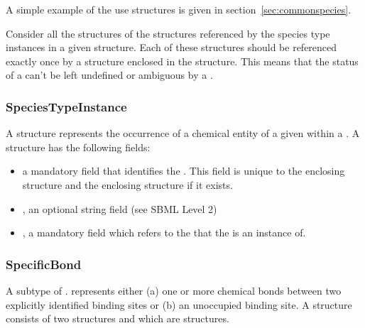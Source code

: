 \documentclass{cekarticle}
\begin{document}
A simple example of the use  structures is given in section~\ref{sec:commonspecies}.

Consider all the  structures of the 
structures referenced by the species type instances in a given 
structure.  Each of these  structures should be referenced exactly once by a
 structure enclosed in the  structure.  This means that
the status of a  can't be left undefined or ambiguous by a .

\subsubsection{SpeciesTypeInstance}

A  structure represents the occurrence of a chemical entity of a given
 within a .  A  structure has the
following fields:

\begin{itemize}

\item {} a mandatory  field that identifies the .
This field is unique to the enclosing  structure and the enclosing
 structure if it exists.

\item {}, an optional string field (see SBML Level 2)

\item {}, a mandatory  field which refers to the 
that the  is an instance of.

\end{itemize}

\subsubsection{SpecificBond}

A subtype of .    represents either (a) one or more chemical bonds
between two explicitly identified binding sites or (b) an unoccupied binding site.  A 
structure consists of two
structures
 and
 which are  structures.
\end{document}
